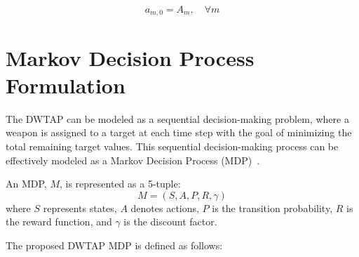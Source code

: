 \documentclass[smallcondensed]{svjour3}
\begin{document}
\begin{equation}\label{eq:initial_ammunition}
    a_{m,0} = A_m, \quad \forall m
\end{equation}

\section{Markov Decision Process Formulation}
\label{sec:mdp}

The DWTAP can be modeled as a sequential decision-making problem, where a weapon is assigned to a target at each time step with the goal of minimizing the total remaining target values. This sequential decision-making process can be effectively modeled as a Markov Decision Process (MDP)~\cite{bellman1957dynamic}.

An MDP, $M$, is represented as a 5-tuple:
\begin{equation}
M = (S, A, P, R, \gamma)
\end{equation}
where $S$ represents states, $A$ denotes actions, $P$ is the transition probability, $R$ is the reward function, and $\gamma$ is the discount factor.

The proposed DWTAP MDP is defined as follows:
\end{document}
